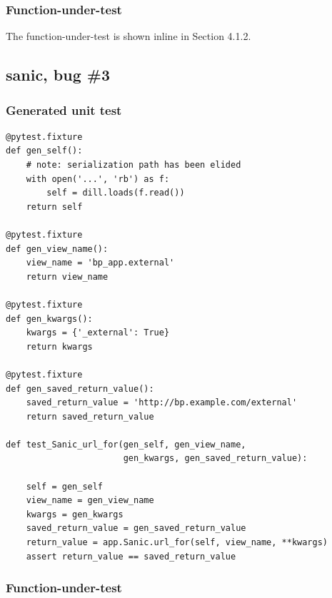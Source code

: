 \subsubsection{Function-under-test}

The function-under-test is shown inline in Section 4.1.2.


\label{sec:sanic-fully-functional-ut}

\subsection{sanic, bug \#3}

\subsubsection{Generated unit test}
\begin{verbatim}
@pytest.fixture
def gen_self():
    # note: serialization path has been elided
    with open('...', 'rb') as f:
        self = dill.loads(f.read())
    return self

@pytest.fixture
def gen_view_name():
    view_name = 'bp_app.external'
    return view_name

@pytest.fixture
def gen_kwargs():
    kwargs = {'_external': True}
    return kwargs

@pytest.fixture
def gen_saved_return_value():
    saved_return_value = 'http://bp.example.com/external'
    return saved_return_value

def test_Sanic_url_for(gen_self, gen_view_name,
                       gen_kwargs, gen_saved_return_value):

    self = gen_self
    view_name = gen_view_name
    kwargs = gen_kwargs
    saved_return_value = gen_saved_return_value
    return_value = app.Sanic.url_for(self, view_name, **kwargs)
    assert return_value == saved_return_value
\end{verbatim}


\subsubsection{Function-under-test}

